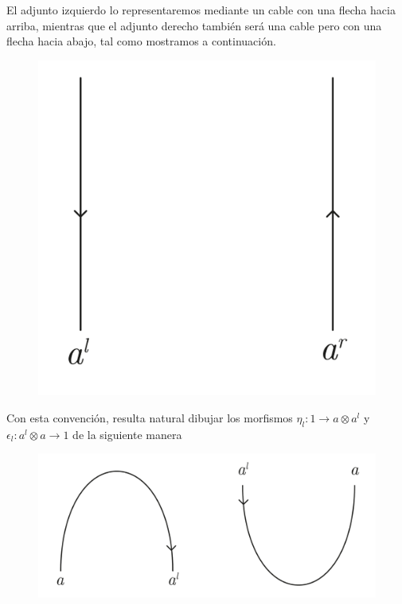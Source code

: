 \documentclass[../main.tex]{subfiles}
\begin{document}
	El adjunto izquierdo lo representaremos mediante un cable con una flecha hacia arriba, mientras que el adjunto derecho también será una cable pero con una flecha hacia abajo, tal como mostramos a continuación.
    \begin{center}
        \begin{figure}[H]
		\includegraphics[scale=.2]{TeX/diagrama/5-1.pdf}
		\centering
	\end{figure}
    \end{center}
	Con esta convención, resulta natural dibujar los morfismos $\eta_l:1 \to a \otimes a^l$ y $\epsilon_l : a^l \otimes a \to 1$ de la siguiente manera
        \begin{center}
        \begin{figure}[H]
		\includegraphics[scale=.2]{TeX/diagrama/5-2.pdf}
		\centering
	   \end{figure}
        \end{center}
\end{document}
